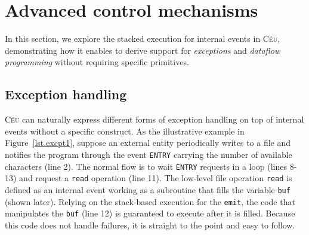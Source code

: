 \documentclass{acm_proc_article-sp}
\newcommand{\CEU}{\textsc{C\'{e}u}\xspace}
\newcommand{\code}[1] {{\small{\texttt{#1}}}}
\newcommand{\DOFIN}{\code{do-finally}\xspace}
\newcommand{\1}{\;}
\newcommand{\2}{\;\;}
\newcommand{\3}{\;\;\;}
\newcommand{\5}{\;\;\;\;\;}
\begin{document}
\section{Advanced control mechanisms}
\label{sec.adv}

In this section, we explore the stacked execution for internal events in \CEU, 
demonstrating how it enables to derive support for \emph{exceptions} and 
\emph{dataflow programming} without requiring specific primitives.

\begin{comment}
Although the described mechanisms involve thoughtful techniques, they can be 
easily abstracted with compile-time macros taking advantage of the structured 
style of \CEU%
\footnote{Our programs in \CEU make extensive use of the \emph{m4} 
preprocessor.}.
As an exception, the \DOFIN construct to be presented in 
Section~\ref{sec.adv.fin} makes slight global additions to the program tree and 
requires a dedicated syntax.
\end{comment}

\subsection{Exception handling}
\label{sec.adv.excpt}

\begin{comment}
Exception handling can be provided by specialized programming language 
constructs (e.g., \code{try-catch} blocks in Java), but also with techniques 
using standard control-flow primitives (e.g., \code{setjmp/longjmp} in $C$).
\end{comment}

\CEU can naturally express different forms of exception handling on top of 
internal events without a specific construct.
%
As the illustrative example in Figure~\ref{lst.excpt1}, suppose an external 
entity periodically writes to a file and notifies the program through the event 
\code{ENTRY} carrying the number of available characters (line 2).
The normal flow is to wait \code{ENTRY} requests in a loop (lines 8-13) and 
request a \code{read} operation (line 11).
The low-level file operation \code{read} is defined as an internal event
working as a subroutine that fills the variable \code{buf} (shown later).
Relying on the stack-based execution for the \code{emit}, the code that 
manipulates the \code{buf} (line 12) is guaranteed to execute after it is 
filled.
Because this code does not handle failures, it is straight to the point and 
easy to follow.
\end{document}
